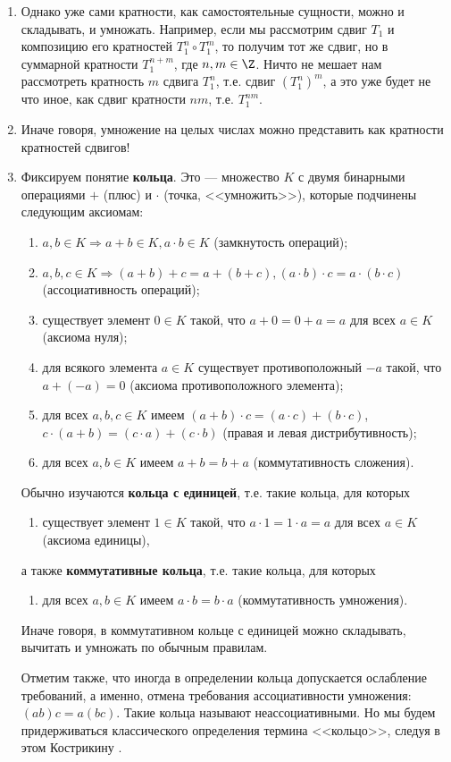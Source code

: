 \begin{enumerate}
\item Однако уже сами кратности, как самостоятельные сущности, можно и складывать, и умножать. Например, если мы рассмотрим сдвиг $T_1$ и композицию его кратностей $T_1^n\circ T_1^m$, то получим тот же сдвиг, но в суммарной кратности $T_1^{n+m}$, где $n,m\in\Z$. Ничто не мешает нам рассмотреть кратность $m$ сдвига $T_1^n$, т.е. сдвиг $(T_1^n)^m$, а это уже будет не что иное, как сдвиг кратности $nm$, т.е. $T_1^{nm}$.
\item Иначе говоря, умножение на целых числах можно представить как кратности кратностей сдвигов!

\item Фиксируем понятие \textbf{кольца}. Это --- множество $K$ с двумя бинарными операциями $+$ (плюс) и $\cdot$ (точка, <<умножить>>), которые подчинены следующим аксиомам:
\begin{enumerate}[{\bf R}1]
\item $a,b\in K\Rightarrow a+b\in K, a\cdot b\in K$ (замкнутость операций);
\item $a,b,c\in K\Rightarrow (a+b)+c=a+(b+c), (a\cdot b)\cdot c = a\cdot (b\cdot c)$ (ассоциативность операций);
\item существует элемент $0\in K$ такой, что $a+0=0+a=a$ для всех $a\in K$ (аксиома нуля);
\item для всякого элемента $a\in K$ существует противоположный $-a$ такой, что $a+(-a)=0$ (аксиома противоположного элемента);
\item для всех $a,b,c\in K$ имеем $(a+b)\cdot c=(a\cdot c)+(b\cdot c)$, $c\cdot(a+b)=(c\cdot a)+(c\cdot b)$ (правая и левая дистрибутивность);
\item для всех $a,b\in K$ имеем $a+b=b+a$ (коммутативность сложения).
\end{enumerate}

Обычно изучаются \textbf{кольца с единицей}, т.е. такие кольца, для которых
\begin{enumerate}[resume*]
\item существует элемент $1\in K$ такой, что $a\cdot 1=1\cdot a=a$ для всех $a\in K$ (аксиома единицы),
\end{enumerate}
а также \textbf{коммутативные кольца}, т.е. такие кольца, для которых
\begin{enumerate}[resume*]
\item для всех $a,b\in K$ имеем $a\cdot b=b\cdot a$ (коммутативность умножения).
\end{enumerate}

Иначе говоря, в коммутативном кольце с единицей можно складывать, вычитать и умножать по обычным правилам.

Отметим также, что иногда в определении кольца допускается ослабление требований, а именно, отмена требования ассоциативности умножения: $(ab)c = a(bc)$. Такие кольца называют неассоциативными. Но мы будем придерживаться классического определения термина <<кольцо>>, следуя в этом Кострикину \cite{Kostrikin}.
\end{enumerate}


